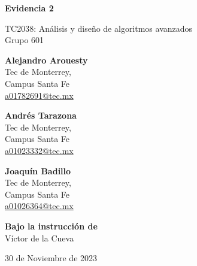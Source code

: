 \documentclass[12pt]{article}
\begin{document}
  \begin{titlepage}
    \begin{center}    
        \vspace{30pt}
            \begin{LARGE}\bf{Evidencia 2}\end{LARGE}
          
            \vspace{40pt}
    
            TC2038: Análisis y diseño de algoritmos avanzados\\
            Grupo 601\\
            
            \vspace{120pt}

            \begin{multicols}{3}
              \textbf{Alejandro Arouesty}\\
              Tec de Monterrey,\\
              Campus Santa Fe\\
              \href{mailto:a01782691@tec.mx}{a01782691@tec.mx}
              
              \columnbreak

              \textbf{Andrés Tarazona}\\
              Tec de Monterrey,\\
              Campus Santa Fe\\
              \href{mailto:a01023332@tec.mx}{a01023332@tec.mx}
              
              \columnbreak

              \textbf{Joaquín Badillo}\\
              Tec de Monterrey,\\
              Campus Santa Fe\\
              \href{mailto:a01026364@tec.mx}{a01026364@tec.mx}
            \end{multicols}
            
            \vspace{100pt}
            
            \textbf{Bajo la instrucción de} \\
            Víctor de la Cueva\\
            
            
            \vspace{120pt}
            
            30 de Noviembre de 2023
        \end{center}
    \end{titlepage}
    \pagebreak
\end{document}
